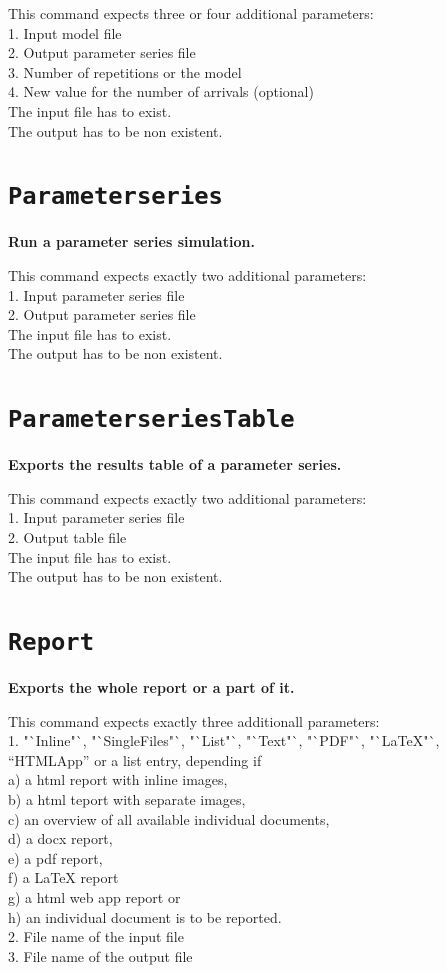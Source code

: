 This command expects three or four additional parameters:\\
1. Input model file\\
2. Output parameter series file\\
3. Number of repetitions or the model\\
4. New value for the number of arrivals (optional)\\
The input file has to exist.\\
The output has to be non existent.

\section{\texttt{Parameterseries}}

\textbf{Run a parameter series simulation.}

This command expects exactly two additional parameters:\\
1. Input parameter series file\\
2. Output parameter series file\\
The input file has to exist.\\
The output has to be non existent.

\section{\texttt{ParameterseriesTable}}

\textbf{Exports the results table of a parameter series.}

This command expects exactly two additional parameters:\\
1. Input parameter series file\\
2. Output table file\\
The input file has to exist.\\
The output has to be non existent.

\section{\texttt{Report}}

\textbf{Exports the whole report or a part of it.}

This command expects exactly three additionall parameters:\\
1. "`Inline"`, "`SingleFiles"`, "`List"`, "`Text"`, "`PDF"`, "`LaTeX"`, "`HTMLApp"' or a list entry, depending if\\
a) a html report with inline images,\\
b) a html teport with separate images,\\
c) an overview of all available individual documents,\\
d) a docx report,\\
e) a pdf report,\\
f) a LaTeX report\\
g) a html web app report or\\
h) an individual document is to be reported.\\
2. File name of the input file\\
3. File name of the output file

